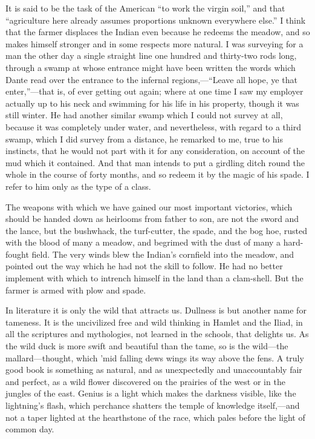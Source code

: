 \documentclass[twoside,openright,10pt]{memoir} %
\begin{document}
It is said to be the task of the American “to work the virgin soil,” and that “agriculture here already assumes proportions unknown everywhere else.” I think that the farmer displaces the Indian even because he redeems the meadow, and so makes himself stronger and in some respects more natural. I was surveying for a man the other day a single straight line one hundred and thirty-two rods long, through a swamp at whose entrance might have been written the words which Dante read over the entrance to the infernal regions,—“Leave all hope, ye that enter,”—that is, of ever getting out again; where at one time I saw my employer actually up to his neck and swimming for his life in his property, though it was still winter. He had another similar swamp which I could not survey at all, because it was completely under water, and nevertheless, with regard to a third swamp, which I did survey from a distance, he remarked to me, true to his instincts, that he would not part with it for any consideration, on account of the mud which it contained. And that man intends to put a girdling ditch round the whole in the course of forty months, and so redeem it by the magic of his spade. I refer to him only as the type of a class.

The weapons with which we have gained our most important victories, which should be handed down as heirlooms from father to son, are not the sword and the lance, but the bushwhack, the turf-cutter, the spade, and the bog hoe, rusted with the blood of many a meadow, and begrimed with the dust of many a hard-fought field. The very winds blew the Indian’s cornfield into the meadow, and pointed out the way which he had not the skill to follow. He had no better implement with which to intrench himself in the land than a clam-shell. But the farmer is armed with plow and spade.

In literature it is only the wild that attracts us. Dullness is but another name for tameness. It is the uncivilized free and wild thinking in Hamlet and the Iliad, in all the scriptures and mythologies, not learned in the schools, that delights us. As the wild duck is more swift and beautiful than the tame, so is the wild—the mallard—thought, which 'mid falling dews wings its way above the fens. A truly good book is something as natural, and as unexpectedly and unaccountably fair and perfect, as a wild flower discovered on the prairies of the west or in the jungles of the east. Genius is a light which makes the darkness visible, like the lightning’s flash, which perchance shatters the temple of knowledge itself,—and not a taper lighted at the hearthstone of the race, which pales before the light of common day.
\end{document}
